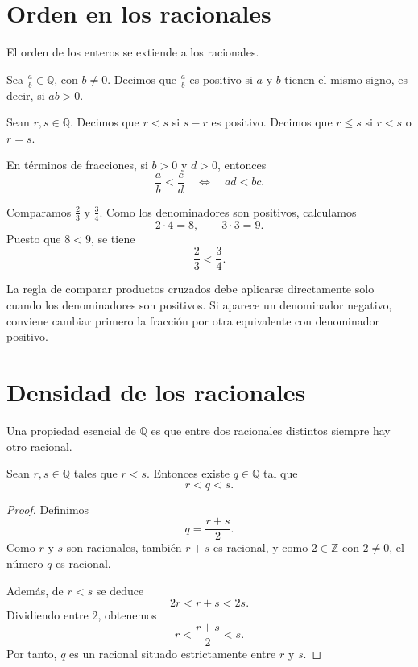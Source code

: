 \section{Orden en los racionales}

El orden de los enteros se extiende a los racionales.

\begin{definicion}
Sea \(\frac{a}{b}\in\mathbb{Q}\), con \(b\neq 0\). Decimos que \(\frac{a}{b}\) es positivo si \(a\) y \(b\) tienen el mismo signo, es decir, si \(ab>0\).
\end{definicion}

\begin{definicion}
Sean \(r,s\in\mathbb{Q}\). Decimos que \(r<s\) si \(s-r\) es positivo. Decimos que \(r\leq s\) si \(r<s\) o \(r=s\).
\end{definicion}

En términos de fracciones, si \(b>0\) y \(d>0\), entonces
\[
  \frac{a}{b}<\frac{c}{d}
  \quad \Longleftrightarrow \quad
  ad<bc.
\]

\begin{ejemplo}
Comparamos \(\frac{2}{3}\) y \(\frac{3}{4}\). Como los denominadores son positivos, calculamos
\[
  2\cdot 4=8,
  \qquad
  3\cdot 3=9.
\]
Puesto que \(8<9\), se tiene
\[
  \frac{2}{3}<\frac{3}{4}.
\]
\end{ejemplo}

\begin{advertencia}
La regla de comparar productos cruzados debe aplicarse directamente solo cuando los denominadores son positivos. Si aparece un denominador negativo, conviene cambiar primero la fracción por otra equivalente con denominador positivo.
\end{advertencia}

\section{Densidad de los racionales}

Una propiedad esencial de \(\mathbb{Q}\) es que entre dos racionales distintos siempre hay otro racional.

\begin{teorema}
Sean \(r,s\in\mathbb{Q}\) tales que \(r<s\). Entonces existe \(q\in\mathbb{Q}\) tal que
\[
  r<q<s.
\]
\end{teorema}

\begin{proof}
Definimos
\[
  q=\frac{r+s}{2}.
\]
Como \(r\) y \(s\) son racionales, también \(r+s\) es racional, y como \(2\in\mathbb{Z}\) con \(2\neq 0\), el número \(q\) es racional.

Además, de \(r<s\) se deduce
\[
  2r<r+s<2s.
\]
Dividiendo entre \(2\), obtenemos
\[
  r<\frac{r+s}{2}<s.
\]
Por tanto, \(q\) es un racional situado estrictamente entre \(r\) y \(s\).
\end{proof}

